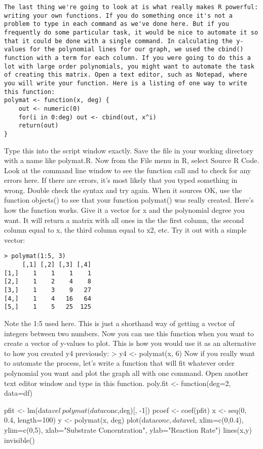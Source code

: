 {\begin{framed}
\begin{verbatim}
The last thing we're going to look at is what really makes R powerful: writing your own functions. If you do something once it's not a problem to type in each command as we've done here. But if you frequently do some particular task, it would be nice to automate it so that it could be done with a single command. In calculating the y-values for the polynomial lines for our graph, we used the cbind() function with a term for each column. If you were going to do this a lot with large order polynomials, you might want to automate the task of creating this matrix. Open a text editor, such as Notepad, where you will write your function. Here is a listing of one way to write this function: 
polymat <- function(x, deg) {
    out <- numeric(0)
    for(i in 0:deg) out <- cbind(out, x^i)
    return(out)
}
\end{verbatim}
\end{framed}
Type this into the script window exactly. Save the file in your working directory with a name like polymat.R. Now from the File menu in R, select Source R Code. Look at the command line window to see the function call and to check for any errors here. If there are errors, it's most likely that you typed something in wrong. Double check the syntax and try again. When it sources OK, use the function objects() to see that your function polymat() was really created. Here's how the function works. Give it a vector for x and the polynomial degree you want. It will return a matrix with all ones in the the first column, the second column equal to x, the third column equal to x2, etc. Try it out with a simple vector: 
\begin{framed}
\begin{verbatim}
> polymat(1:5, 3)
     [,1] [,2] [,3] [,4] 
[1,]    1    1    1    1
[2,]    1    2    4    8
[3,]    1    3    9   27
[4,]    1    4   16   64
[5,]    1    5   25  125

\end{verbatim}
\end{framed}
Note the 1:5 used here. This is just a shorthand way of getting a vector of integers between two numbers. Now you can use this function when you want to create a vector of y-values to plot. This is how you would use it as an alternative to how you created y4 previously: 
> y4 <- polymat(x, 6) %
Now if you really want to automate the process, let's write a function that will fit whatever order polynomial you want and plot the graph all with one command. Open another text editor window and type in this function. 
poly.fit <- function(deg=2, data=df) {
    pfit <- lm(data$vel~polymat(data$conc,deg)[, -1])
    pcoef <- coef(pfit)
    x <- seq(0, 0.4, length=100)
    y <- polymat(x, deg) %
    plot(data$conc, data$vel, xlim=c(0,0.4), ylim=c(0,5),
         xlab="Substrate Concentration", ylab="Reaction Rate")
    lines(x,y)
    invisible()

}}
